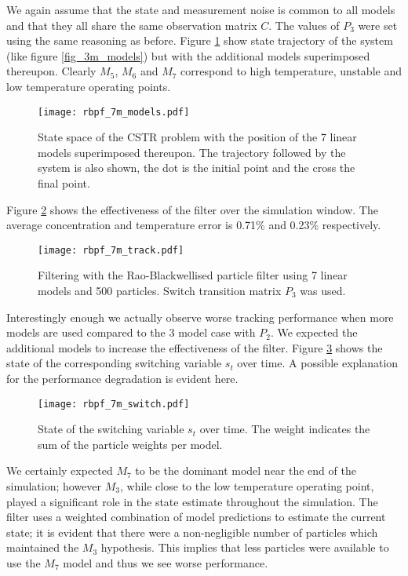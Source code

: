 We again assume that the state and measurement noise is common to all models and that they all share the same observation matrix $C$. The values of $P_3$ were set using the same reasoning as before. Figure \ref{fig_7m_models} show state trajectory of the system (like figure \ref{fig_3m_models}) but with the additional models superimposed thereupon. Clearly $M_5$, $M_6$ and $M_7$ correspond to high temperature, unstable and low temperature operating points. 
\begin{figure}[H] 
\centering
\texttt{[image: rbpf\_7m\_models.pdf]}
\caption{State space of the CSTR problem with the position of the 7 linear models superimposed thereupon. The trajectory followed by the system is also shown, the dot is the initial point and the cross the final point.}
\label{fig_7m_models}
\end{figure}
Figure \ref{fig_7m_track} shows the effectiveness of the filter over the simulation window. The average concentration and temperature error is 0.71\% and 0.23\% respectively. 
\begin{figure}[H] 
\centering
\texttt{[image: rbpf\_7m\_track.pdf]}
\caption{Filtering with the Rao-Blackwellised particle filter using 7 linear models and 500 particles. Switch transition matrix $P_3$ was used.}
\label{fig_7m_track}
\end{figure}
Interestingly enough we actually observe worse tracking performance when more models are used compared to the 3 model case with $P_2$. We expected the additional models to increase the effectiveness of the filter. Figure \ref{fig_7m_switch} shows the state of the corresponding switching variable $s_t$ over time. A possible explanation for the performance degradation is evident here.
\begin{figure}[H] 
\centering
\texttt{[image: rbpf\_7m\_switch.pdf]}
\caption{State of the switching variable $s_t$ over time. The weight indicates the sum of the particle weights per model.}
\label{fig_7m_switch}
\end{figure}
We certainly expected $M_7$ to be the dominant model near the end of the simulation; however $M_3$, while close to the low temperature operating point, played a significant role in the state estimate throughout the simulation. The filter uses a weighted combination of model predictions to estimate the current state; it is evident that there were a non-negligible number of particles which maintained the $M_3$ hypothesis. This implies that less particles were available to use the $M_7$ model and thus we see worse performance.


